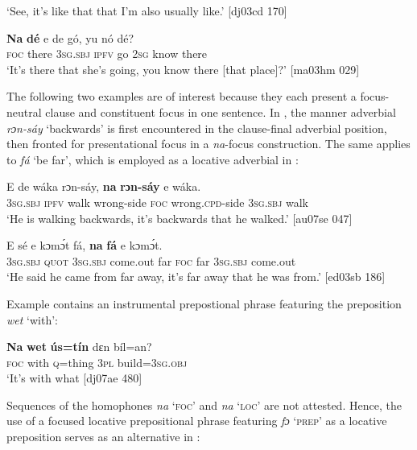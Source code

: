 \glt ‘See, it’s like that that I’m also usually like.’ [dj03cd 170]
\z


\ea%
    \label{ex:key:705}
    \gll \textbf{Na}  \textbf{dé}    e    de  gó,  yu  nó    dé?\\
\textsc{foc}  there  \textsc{3sg.sbj}  \textsc{ipfv}  go  \textsc{2sg}  know  there\\

\glt ‘It’s there that she’s going, you know there [that place]?’ [ma03hm 029]
\z

The following two examples are of interest because they each present a focus-neutral clause and constituent focus in one sentence. In , the manner adverbial \textit{rɔn-sáy} ‘backwards’ is first encountered in the clause-final adverbial position, then fronted for presentational focus in a \textit{na}{}-focus construction. The same applies to \textit{fá} ‘be far’, which is employed as a locative adverbial in : 


\ea%
    \label{ex:key:706}
    \gll E    de  wáka  rɔn-sáy,    \textbf{na}  \textbf{rɔn-sáy} e    wáka.\\
\textsc{3sg.sbj}  \textsc{ipfv}  walk  wrong-side  \textsc{foc}  wrong.\textsc{cpd}{}-side  \textsc{3sg.sbj}  walk\\

\glt  ‘He is walking backwards, it’s backwards that he walked.’ [au07se 047]
\z


\ea%
    \label{ex:key:707}
    \gll E    sé    e    kɔmɔ́t    fá,  \textbf{na}  \textbf{fá} e    kɔmɔ́t.\\
\textsc{3sg.sbj}  \textsc{quot}    \textsc{3sg.sbj}  come.out  far  \textsc{foc}  far  \textsc{3sg.sbj}  come.out\\

\glt  ‘He said he came from far away, it’s far away that he was from.’ [ed03sb 186]
\z

Example  contains an instrumental prepostional phrase featuring the preposition \textit{wet} ‘with’:


\ea%
    \label{ex:key:708}
    \gll \textbf{Na}  \textbf{wet}    \textbf{ús=tín}  dɛn  bíl=an?\\
\textsc{foc}  with    \textsc{q}=thing  \textsc{3pl}  build=\textsc{3sg.obj}\\

\glt ‘It’s with what [dj07ae 480]
\z

Sequences of the homophones \textit{na} ‘\textsc{foc}’ and \textit{na} ‘\textsc{loc}’ are not attested. Hence, the use of a focused locative prepositional phrase featuring \textit{fɔ} ‘\textsc{prep}’ as a locative preposition serves as an alternative in :


